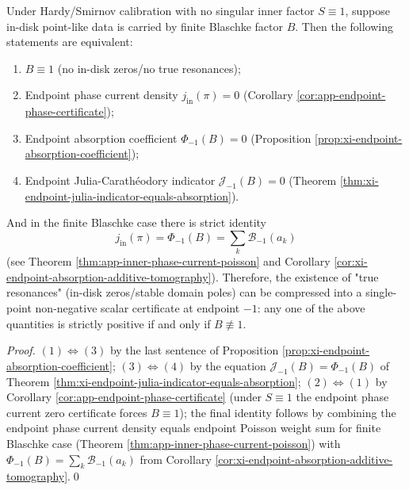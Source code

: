 \begin{theorem}\label{thm:xi-endpoint-single-point-certificate-complete}
Under Hardy/Smirnov calibration with no singular inner factor \(S\equiv 1\), suppose in-disk point-like data is carried by finite Blaschke factor \(B\).
Then the following statements are equivalent:
\begin{enumerate}
  \item \(B\equiv 1\) (no in-disk zeros/no true resonances);
  \item Endpoint phase current density \(j_{\mathrm{in}}(\pi)=0\) (Corollary \ref{cor:app-endpoint-phase-certificate});
  \item Endpoint absorption coefficient \(\Phi_{-1}(B)=0\) (Proposition \ref{prop:xi-endpoint-absorption-coefficient});
  \item Endpoint Julia-Carathéodory indicator \(\mathcal{J}_{-1}(B)=0\) (Theorem \ref{thm:xi-endpoint-julia-indicator-equals-absorption}).
\end{enumerate}
And in the finite Blaschke case there is strict identity
\[
\boxed{\;
j_{\mathrm{in}}(\pi)=\Phi_{-1}(B)=\sum_k\mathcal{B}_{-1}(a_k)\; }
\]
(see Theorem \ref{thm:app-inner-phase-current-poisson} and Corollary \ref{cor:xi-endpoint-absorption-additive-tomography}).
Therefore, the existence of "true resonances" (in-disk zeros/stable domain poles) can be compressed into a single-point non-negative scalar certificate at endpoint \(-1\): any one of the above quantities is strictly positive if and only if \(B\not\equiv 1\).
\end{theorem}

\begin{proof}
\((1)\Leftrightarrow(3)\) by the last sentence of Proposition \ref{prop:xi-endpoint-absorption-coefficient};
\((3)\Leftrightarrow(4)\) by the equation \(\mathcal{J}_{-1}(B)=\Phi_{-1}(B)\) of Theorem \ref{thm:xi-endpoint-julia-indicator-equals-absorption};
\((2)\Leftrightarrow(1)\) by Corollary \ref{cor:app-endpoint-phase-certificate} (under \(S\equiv 1\) the endpoint phase current zero certificate forces \(B\equiv 1\));
the final identity follows by combining the endpoint phase current density equals endpoint Poisson weight sum for finite Blaschke case (Theorem \ref{thm:app-inner-phase-current-poisson}) with \(\Phi_{-1}(B)=\sum_k\mathcal{B}_{-1}(a_k)\) from Corollary \ref{cor:xi-endpoint-absorption-additive-tomography}.\qed
\end{proof}

